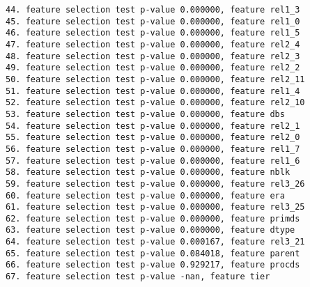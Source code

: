 \begin{verbatim}
44. feature selection test p-value 0.000000, feature rel1_3
45. feature selection test p-value 0.000000, feature rel1_0
46. feature selection test p-value 0.000000, feature rel1_5
47. feature selection test p-value 0.000000, feature rel2_4
48. feature selection test p-value 0.000000, feature rel2_3
49. feature selection test p-value 0.000000, feature rel2_2
50. feature selection test p-value 0.000000, feature rel2_11
51. feature selection test p-value 0.000000, feature rel1_4
52. feature selection test p-value 0.000000, feature rel2_10
53. feature selection test p-value 0.000000, feature dbs
54. feature selection test p-value 0.000000, feature rel2_1
55. feature selection test p-value 0.000000, feature rel2_0
56. feature selection test p-value 0.000000, feature rel1_7
57. feature selection test p-value 0.000000, feature rel1_6
58. feature selection test p-value 0.000000, feature nblk
59. feature selection test p-value 0.000000, feature rel3_26
60. feature selection test p-value 0.000000, feature era
61. feature selection test p-value 0.000000, feature rel3_25
62. feature selection test p-value 0.000000, feature primds
63. feature selection test p-value 0.000000, feature dtype
64. feature selection test p-value 0.000167, feature rel3_21
65. feature selection test p-value 0.084018, feature parent
66. feature selection test p-value 0.929217, feature procds
67. feature selection test p-value -nan, feature tier


\end{verbatim}
